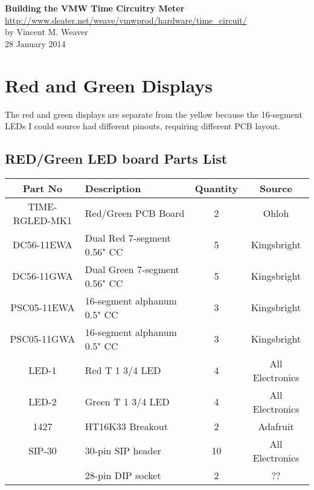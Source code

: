 \documentclass[11pt]{article}
\begin{document}
\begin{center}
{\Large \bf Building the VMW Time Circuitry Meter}\\
\url{http://www.deater.net/weave/vmwprod/hardware/time_circuit/}\\
by Vincent M. Weaver\\
28 January 2014
\end{center}

\section{Red and Green Displays}

The red and green displays are separate from the yellow because
the 16-segment LEDs I could source had different pinouts, requiring
different PCB layout.

\subsection{RED/Green LED board Parts List}

\begin{tabular}{|c|l|c|c|}
\hline
Part No   &  Description    &  Quantity    &   Source \\
\hline
\hline

TIME-RGLED-MK1 &Red/Green PCB Board            & 2 & Ohloh\\ %
DC56-11EWA     & Dual Red 7-segment 0.56" CC   & 5 & Kingsbright\\ %
DC56-11GWA     & Dual Green 7-segment 0.56" CC & 5 & Kingsbright\\ %
PSC05-11EWA    & 16-segment alphanum 0.5" CC   & 3 & Kingsbright\\ %
PSC05-11GWA    & 16-segment alphanum 0.5" CC   & 3 & Kingsbright\\ %
LED-1          & Red T 1 3/4 LED               & 4 & All Electronics\\ %
LED-2          & Green T 1 3/4 LED             & 4 & All Electronics\\ %
1427           & HT16K33 Breakout              & 2 & Adafruit\\ %
SIP-30	       & 30-pin SIP header             & 10 & All Electronics\\ %
               & 28-pin DIP socket             & 2 & ?? \\ %
\end{tabular}

\end{document}
